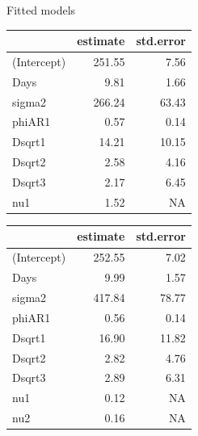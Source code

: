 \begin{frame}[fragile]{Fitted models}
\protect\hypertarget{fitted-models}{}

\scriptsize

\begin{Shaded}
\end{Shaded}

\begin{longtable}[]{@{}lrr@{}}
\toprule
& estimate & std.error\tabularnewline
\midrule
\endhead
(Intercept) & 251.55 & 7.56\tabularnewline
Days & 9.81 & 1.66\tabularnewline
sigma2 & 266.24 & 63.43\tabularnewline
phiAR1 & 0.57 & 0.14\tabularnewline
Dsqrt1 & 14.21 & 10.15\tabularnewline
Dsqrt2 & 2.58 & 4.16\tabularnewline
Dsqrt3 & 2.17 & 6.45\tabularnewline
nu1 & 1.52 & NA\tabularnewline
\bottomrule
\end{longtable}

\end{frame}

\begin{frame}[fragile]

\scriptsize

\begin{Shaded}
\end{Shaded}

\begin{longtable}[]{@{}lrr@{}}
\toprule
& estimate & std.error\tabularnewline
\midrule
\endhead
(Intercept) & 252.55 & 7.02\tabularnewline
Days & 9.99 & 1.57\tabularnewline
sigma2 & 417.84 & 78.77\tabularnewline
phiAR1 & 0.56 & 0.14\tabularnewline
Dsqrt1 & 16.90 & 11.82\tabularnewline
Dsqrt2 & 2.82 & 4.76\tabularnewline
Dsqrt3 & 2.89 & 6.31\tabularnewline
nu1 & 0.12 & NA\tabularnewline
nu2 & 0.16 & NA\tabularnewline
\bottomrule
\end{longtable}

\end{frame}

